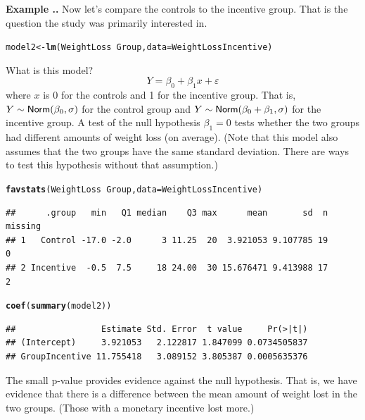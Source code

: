 \documentclass[twoside]{book}
\makeatletter
\newcommand{\hlopt}[1]{\textcolor[rgb]{0,0,0}{#1}}%
\newcommand{\hlstd}[1]{\textcolor[rgb]{0.345,0.345,0.345}{#1}}%
\newcommand{\hlkwb}[1]{\textcolor[rgb]{0.69,0.353,0.396}{#1}}%
\newcommand{\hlkwc}[1]{\textcolor[rgb]{0.333,0.667,0.333}{#1}}%
\newcommand{\hlkwd}[1]{\textcolor[rgb]{0.737,0.353,0.396}{\textbf{#1}}}%
\newenvironment{kframe}{%
 \def\at@end@of@kframe{}%
 \ifinner\ifhmode%
  \def\at@end@of@kframe{\end{minipage}}%
  \begin{minipage}{\columnwidth}%
 \fi\fi%
 \def\FrameCommand##1{\hskip\@totalleftmargin \hskip-\fboxsep
 \colorbox{shadecolor}{##1}\hskip-\fboxsep
     \hskip-\linewidth \hskip-\@totalleftmargin \hskip\columnwidth}%
 \MakeFramed {\advance\hsize-\width
   \@totalleftmargin\z@ \linewidth\hsize
   \@setminipage}}%
 {\par\unskip\endMakeFramed%
 \at@end@of@kframe}
\newenvironment{knitrout}{}{} %
\newcounter{example}[section]
\newenvironment{example}%
{\refstepcounter{example}%
\textbf{Example \thesection.\arabic{example}. }}%
{}
\makeatother
\begin{document}
\begin{example}
	Now let's compare the controls to the incentive group.  That is the question 
	the study was primarily interested in.
\begin{knitrout}
\color{fgcolor}\begin{kframe}
\begin{alltt}
\hlstd{model2} \hlkwb{<-} \hlkwd{lm}\hlstd{(WeightLoss} \hlopt{~} \hlstd{Group,} \hlkwc{data} \hlstd{= WeightLossIncentive)}
\end{alltt}
\end{kframe}
\end{knitrout}
	What is this model?
	\[
	Y = \beta_0 + \beta_1 x + \varepsilon
	\]
where $x$ is 0 for the controls and 1 for the incentive group.  That is, $Y \sim {\textsf{Norm}}(\beta_0, \sigma)$
for the control group and $Y \sim {\textsf{Norm}}(\beta_0 + \beta_1, \sigma)$ for the incentive group.
A test of the null hypothesis $\beta_1 = 0$ tests whether the two groups had different amounts 
of weight loss (on average).   (Note that this model also assumes that the two groups have the same 
standard deviation.  There are ways to test this hypothesis without that assumption.)
\begin{knitrout}
\color{fgcolor}\begin{kframe}
\begin{alltt}
\hlkwd{favstats}\hlstd{(WeightLoss} \hlopt{~} \hlstd{Group,} \hlkwc{data} \hlstd{= WeightLossIncentive)}
\end{alltt}
\begin{verbatim}
##      .group   min   Q1 median    Q3 max      mean       sd  n missing
## 1   Control -17.0 -2.0      3 11.25  20  3.921053 9.107785 19       0
## 2 Incentive  -0.5  7.5     18 24.00  30 15.676471 9.413988 17       2
\end{verbatim}
\begin{alltt}
\hlkwd{coef}\hlstd{(}\hlkwd{summary}\hlstd{(model2))}
\end{alltt}
\begin{verbatim}
##                 Estimate Std. Error  t value     Pr(>|t|)
## (Intercept)     3.921053   2.122817 1.847099 0.0734505837
## GroupIncentive 11.755418   3.089152 3.805387 0.0005635376
\end{verbatim}
\end{kframe}
\end{knitrout}
The small p-value provides evidence against the null hypothesis.  That is, we have evidence that
there is a difference between the mean amount of weight lost in the two groups.  (Those with a monetary
incentive lost more.)  
\end{example}
\end{document}
